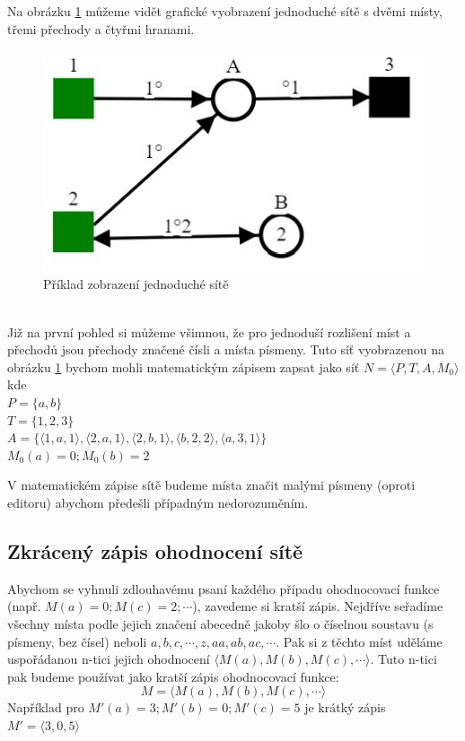 \documentclass[
  biblatex,
  glossaries,
  printversion
]{kidiplom}
\begin{document}
Na obrázku \ref{fig:jednoduchá síť zobrazení} můžeme vidět grafické 
vyobrazení jednoduché sítě s dvěmi místy, třemi přechody a čtyřmi hranami.
\begin{figure}[h]
  \centering
  \includegraphics[scale=0.8]{simple_net}
  \caption{Příklad zobrazení jednoduché sítě}\label{fig:jednoduchá síť zobrazení}
\end{figure}
\\Již na první pohled si můžeme všimnou, že pro jednoduší rozlišení 
míst a přechodů jsou přechody značené čísli a místa písmeny.
Tuto síť vyobrazenou na obrázku \ref{fig:jednoduchá síť zobrazení} 
bychom mohli matematickým zápisem zapsat jako síť 
$ N = \langle P,T,A,M_{0}\rangle $
kde \\
$P = \{a,b\}$ \\
$T = \{1,2,3\}$ \\
$A = \{
  \langle 1,a,1 \rangle,
  \langle 2,a,1 \rangle,
  \langle 2,b,1 \rangle,
  \langle b,2,2 \rangle,
  \langle a,3,1 \rangle
\}$ \\
$M_{0}(a) = 0; M_{0}(b) = 2$

V matematickém zápise sítě budeme místa značit malými písmeny (oproti editoru)
abychom předešli případným nedorozuměním.


\subsection{Zkrácený zápis ohodnocení sítě}

Abychom se vyhnuli zdlouhavému psaní každého případu ohodnocovací funkce
\\(např. $M(a) = 0; M(c) = 2; \dotsb$), zavedeme si kratší zápis.
Nejdříve seřadíme všechny místa podle jejich značení abecedně jakoby šlo 
o číselnou soustavu (s písmeny, bez čísel) 
neboli $a, b, c, \dotsb, z, aa, ab, ac, \dotsb$.
Pak si z těchto míst uděláme uspořádanou n-tici jejich ohodnocení $\langle M(a), M(b), M(c), \dotsb \rangle$.
Tuto n-tici pak budeme používat jako kratší zápis ohodnocovací funkce:
$$
 M = \langle M(a), M(b), M(c), \dotsb \rangle
$$
Například pro $M'(a) = 3; M'(b) = 0; M'(c) = 5$ je krátký zápis $M' = \langle 3,0,5 \rangle$
\end{document}

